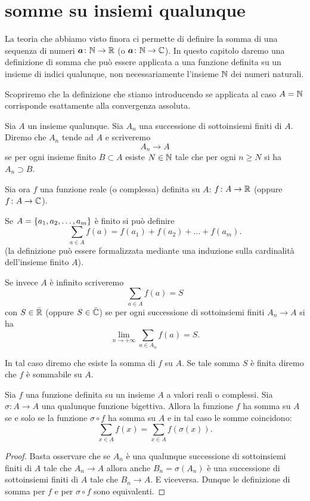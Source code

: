 \section{somme su insiemi qualunque}

La teoria che abbiamo visto finora ci permette di definire
la somma di una sequenza di numeri $\boldsymbol a \colon \mathbb N\to \mathbb R$
(o $\boldsymbol a \colon \mathbb N \to \mathbb C$).
In questo capitolo daremo una definizione di somma che può
essere applicata a una funzione definita su un insieme di indici qualunque, non necessariamente l'insieme $\mathbb N$ dei
numeri naturali.

Scopriremo che la definizione che stiamo introducendo se
applicata al caso $A=\mathbb N$ corrisponde esattamente alla convergenza assoluta.

\begin{definition}
Sia $A$ un insieme qualunque.
Sia $A_n$ una successione di sottoinsiemi finiti di $A$.
Diremo che $A_n$ tende ad $A$ e scriveremo
\[
  A_n \to A
\]
se per ogni insieme finito $B\subset A$ esiste $N\in \mathbb N$
tale che per ogni $n\ge N$ si ha $A_n\supset B$.

Sia ora $f$ una funzione reale (o complessa) definita
su $A$: $f\colon A \to \mathbb R$ (oppure $f\colon A \to \mathbb C$).

Se $A = {\left\{ a_1, a_2, \dots, a_m \right\}}$ è finito si può definire
\[
  \sum_{a \in A} f(a) = f(a_1) + f(a_2) + \dots + f(a_m).
\]
(la definizione può essere formalizzata mediante una
induzione sulla cardinalità dell'insieme finito $A$).

Se invece $A$ è infinito scriveremo
\[
  \sum_{a\in A} f(a) = S
\]
con $S\in \bar {\mathbb R}$ (oppure $S\in \bar {\mathbb C}$)
se per ogni successione di sottoinsiemi finiti $A_n \to A$
si ha
\begin{equation}\label{eq:589421}
  \lim_{n\to +\infty}\sum_{a\in A_n}f(a) = S.
\end{equation}

In tal caso diremo che esiste la somma di $f$ su $A$.
Se tale somma $S$ è finita diremo che $f$ è sommabile su $A$.
\end{definition}

\begin{theorem}
  Sia $f$ una funzione definita su un insieme $A$
  a valori reali o complessi. Sia $\sigma\colon A \to A$
  una qualunque funzione bigettiva.
  Allora la funzione $f$ ha somma su $A$ se e solo se
  la funzione $\sigma\circ f$ ha somma su $A$ e in tal
  caso le somme coincidono:
  \[
    \sum_{x\in A} f(x) = \sum_{x\in A} f(\sigma(x)).
  \]
\end{theorem}
%
\begin{proof}
  Basta osservare che se $A_n$ è una qualunque successione
  di sottoinsiemi finiti di $A$ tale che $A_n\to A$
  allora anche $B_n=\sigma(A_n)$ è una successione
  di sottoinsiemi finiti di $A$ tale che $B_n\to A$.
  E viceversa.
  Dunque le definizione di somma per $f$ e per $\sigma\circ f$ sono equivalenti.
\end{proof}

